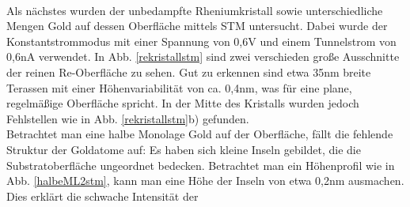 \\
Als nächstes wurden der unbedampfte Rheniumkristall sowie unterschiedliche Mengen Gold auf dessen
Oberfläche mittels STM untersucht. Dabei wurde der Konstantstrommodus mit einer Spannung von 0,6V
und einem Tunnelstrom von 0,6nA verwendet. In Abb. \ref{rekristallstm} sind zwei verschieden große
Ausschnitte der reinen Re-Oberfläche zu sehen. Gut zu erkennen sind etwa 35nm breite Terassen mit
einer Höhenvariabilität von ca. 0,4nm, was für eine plane, regelmäßige Oberfläche spricht. In der
Mitte des Kristalls wurden jedoch Fehlstellen wie in Abb. \ref{rekristallstm}b) gefunden.\\
Betrachtet man eine halbe Monolage Gold auf der Oberfläche, fällt die fehlende Struktur der
Goldatome auf: Es haben sich kleine Inseln gebildet, die die Substratoberfläche ungeordnet bedecken.
Betrachtet man ein Höhenprofil wie in Abb. \ref{halbeML2stm}, kann man eine Höhe der Inseln von
etwa 0,2nm ausmachen. Dies erklärt die schwache Intensität der 


